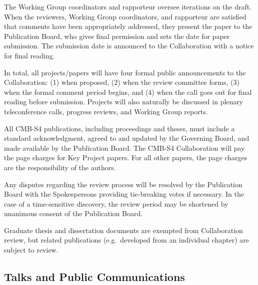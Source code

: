 \documentclass[12pt]{article}
\newcommand{\Comment}[1]{\textcolor{Blue}{(Comment: #1)}}
\begin{document}
The Working Group coordinators and rapporteur oversee iterations on the draft.  When the reviewers, Working Group coordinators, and rapporteur are satisfied that comments have been appropriately addressed, they present the paper to the Publication Board, who gives final permission and sets the date for paper submission.  The submission date is announced to the Collaboration with a notice for final reading.  

In total, all projects/papers will have four formal public announcements to the Collaboration:
(1) when proposed,
(2) when the review committee forms,
(3) when the formal comment period begins, and
(4) when the call goes out for final reading before submission.
  Projects will also naturally be discussed in plenary teleconference calls, progress reviews, and Working Group reports.

All CMB-S4 publications, including proceedings and theses, must include a standard acknowledgment, agreed to and updated by the Governing Board, and made available by the Publication Board.  The CMB-S4 Collaboration will pay the page charges for Key Project papers. For all other papers, the page charges are the responsibility of the authors.

Any disputes regarding the review process will be resolved by the Publication Board with the Spokespersons providing tie-breaking votes if necessary. In the case of a time-sensitive discovery, the review period may be shortened by unanimous consent of the Publication Board.

Graduate thesis and dissertation documents are exempted from Collaboration review, but related publications (e.g.~developed from an individual chapter) are subject to review.

\subsection{Talks and Public Communications}
\end{document}
